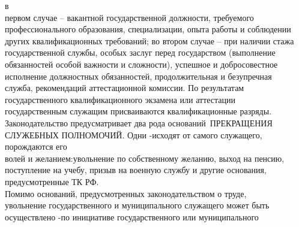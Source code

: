 \documentclass[14pt,a4paper]{extarticle}
\begin{document}
в \\   \vspace{1em} первом случае – вакантной государственной должности, требуемого \\   \vspace{1em} профессионального образования, специализации, опыта работы и
соблюдении \\   \vspace{1em} других квалификационных требований; во втором случае – при наличии
стажа \\   \vspace{1em} государственной службы, особых заслуг перед государством
(выполнение \\   \vspace{1em} обязанностей особой важности и сложности), успешное и
добросовестное \\   \vspace{1em} исполнение должностных обязанностей, продолжительная и
безупречная \\   \vspace{1em} служба, рекомендаций аттестационной комиссии. По результатам \\   \vspace{1em} государственного квалификационного экзамена или аттестации \\   \vspace{1em} государственным служащим присваиваются квалификационные разряды. \\   \vspace{1em} Законодательство предусматривает два рода оснований ПРЕКРАЩЕНИЯ \\   \vspace{1em} СЛУЖЕБНЫХ ПОЛНОМОЧИЙ. Одни -исходят от самого служащего, порождаются
его \\   \vspace{1em} волей и желанием:увольнение по собственному желанию, выход на
пенсию, \\   \vspace{1em} поступление на учебу, призыв на военную службу и другие
основания, \\   \vspace{1em} предусмотренные ТК РФ. \\   \vspace{1em} Помимо оснований, предусмотренных законодательством о труде, \\   \vspace{1em} увольнение государственного и муниципального служащего может быть \\   \vspace{1em} осуществлено -по инициативе государственного или муниципального
\end{document}
